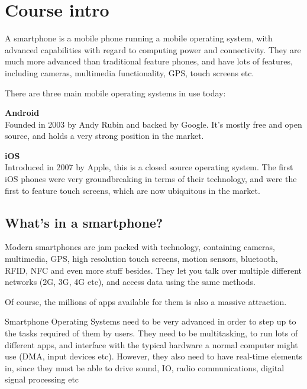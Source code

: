 
\section{Course intro}

A smartphone is a mobile phone running a mobile operating system, with advanced
capabilities with regard to computing power and connectivity. They are much more
advanced than traditional feature phones, and have lots of features, including
cameras, multimedia functionality, GPS, touch screens etc.

There are three main mobile operating systems in use today:

\begin{description}
  \item \textbf{Android}\\
  	Founded in 2003 by Andy Rubin and backed by Google. It's mostly free and
  	open source, and holds a very strong position in the market.
  \item \textbf{iOS}\\
  	Introduced in 2007 by Apple, this is a closed source operating system. The
  	first iOS phones were very groundbreaking in terms of their technology, and
  	were the first to feature touch screens, which are now ubiquitous in the
  	market.
\end{description}

\subsection{What's in a smartphone?}

Modern smartphones are jam packed with technology, containing cameras,
multimedia, GPS, high resolution touch screens, motion sensors, bluetooth, RFID,
NFC and even more stuff besides. They let you talk over multiple different
networks (2G, 3G, 4G etc), and access data using the same methods.

Of course, the millions of apps available for them is also a massive attraction.

Smartphone Operating Systems need to be very advanced in order to step up to the
tasks required of them by users. They need to be multitasking, to run lots of
different apps, and interface with the typical hardware a normal computer might
use (DMA, input devices etc). However, they also need to have real-time elements
in, since they must be able to drive sound, IO, radio communications, digital
signal processing etc


